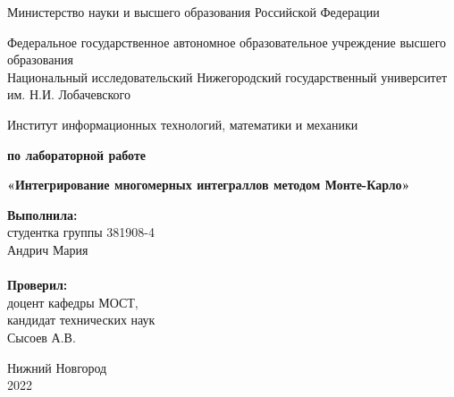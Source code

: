 \documentclass{report}
\begin{document}
\begin{titlepage}

\begin{center}
Министерство науки и высшего образования Российской Федерации
\end{center}

\begin{center}
Федеральное государственное автономное образовательное учреждение высшего образования \\
Национальный исследовательский Нижегородский государственный университет им. Н.И. Лобачевского
\end{center}

\begin{center}
Институт информационных технологий, математики и механики
\end{center}

\vspace{4em}

\begin{center}
\textbf{ по лабораторной работе} \\
\end{center}
\begin{center}
\textbf{\Large«Интегрирование многомерных интеграллов методом Монте-Карло»} \\
\end{center}

\vspace{4em}

\newbox{\lbox}
\newlength{\maxl}
\setlength{\maxl}{\wd\lbox}
\hfill\parbox{7cm}{
\hspace*{5cm}\hspace*{-5cm}\textbf{Выполнила:} \\ студентка группы 381908-4 \\ Андрич Мария\\
\\
\hspace*{5cm}\hspace*{-5cm}\textbf{Проверил:}\\ доцент кафедры МОСТ, \\ кандидат технических наук \\ Сысоев А.В.\\
}
\vspace{\fill}

\begin{center} Нижний Новгород \\ 2022 \end{center}

\end{titlepage}
\end{document}
